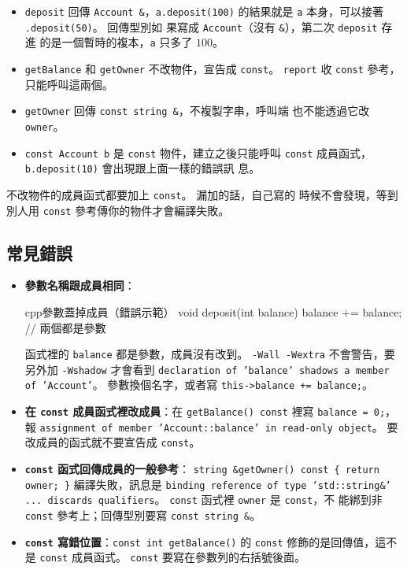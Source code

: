 \begin{itemize}
\item \texttt{deposit} 回傳 \texttt{Account \&}，\texttt{a.deposit(100)}
的結果就是 \texttt{a} 本身，可以接著 \texttt{.deposit(50)}。 回傳型別如
果寫成 \texttt{Account}（沒有 \texttt{\&}），第二次 \texttt{deposit} 存進
的是一個暫時的複本，\texttt{a} 只多了 $100$。
\item \texttt{getBalance} 和 \texttt{getOwner} 不改物件，宣告成
\texttt{const}。 \texttt{report} 收 \texttt{const} 參考，只能呼叫這兩個。
\item \texttt{getOwner} 回傳 \texttt{const string \&}，不複製字串，呼叫端
也不能透過它改 \texttt{owner}。
\item \texttt{const Account b} 是 \texttt{const} 物件，建立之後只能呼叫
\texttt{const} 成員函式，\texttt{b.deposit(10)} 會出現跟上面一樣的錯誤訊
息。
\end{itemize}

不改物件的成員函式都要加上 \texttt{const}。 漏加的話，自己寫的
時候不會發現，等到別人用 \texttt{const} 參考傳你的物件才會編譯失敗。

\subsection{常見錯誤}

\begin{itemize}
\item \textbf{參數名稱跟成員相同}：
\begin{code}{cpp}{參數蓋掉成員（錯誤示範）}
void deposit(int balance) {
    balance += balance;     // 兩個都是參數
}
\end{code}
函式裡的 \texttt{balance} 都是參數，成員沒有改到。 \texttt{-Wall -Wextra}
不會警告，要另外加 \texttt{-Wshadow} 才會看到 \texttt{declaration of
'balance' shadows a member of 'Account'}。 參數換個名字，或者寫
\texttt{this->balance += balance;}。
\item \textbf{在 \texttt{const} 成員函式裡改成員}：在 \texttt{getBalance()
const} 裡寫 \texttt{balance = 0;}，報 \texttt{assignment of member
'Account::balance' in read-only object}。 要改成員的函式就不要宣告成
\texttt{const}。
\item \textbf{\texttt{const} 函式回傳成員的一般參考}：
\texttt{string \&getOwner() const \{ return owner; \}} 編譯失敗，訊息是
\texttt{binding reference of type 'std::string\&' ... discards
qualifiers}。 \texttt{const} 函式裡 \texttt{owner} 是 \texttt{const}，不
能綁到非 \texttt{const} 參考上；回傳型別要寫 \texttt{const string \&}。
\item \textbf{\texttt{const} 寫錯位置}：\texttt{const int getBalance()} 的
\texttt{const} 修飾的是回傳值，這不是 \texttt{const} 成員函式。
\texttt{const} 要寫在參數列的右括號後面。
\end{itemize}

